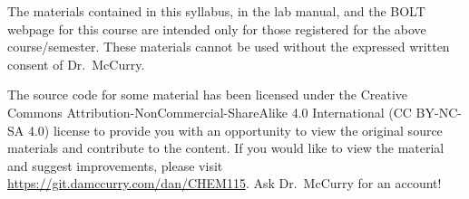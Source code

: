 \documentclass[11pt,letterpaper]{article}
\begin{document}
\vfill

\begin{mdframed}
	\noindent
	The materials contained in this syllabus, in the lab manual, and the
	BOLT webpage for this course are intended only for those registered for
	the above course/semester. These materials cannot be used without the
	expressed written consent of Dr.\ McCurry.

	\noindent
	The source code for some material has been licensed under the Creative
	Commons Attribution-NonCommercial-ShareAlike 4.0 International (CC
	BY-NC-SA 4.0) license to provide you with an opportunity to view the
	original source materials and contribute to the content. If you would
	like to view the material and suggest improvements, please visit
	\url{https://git.damccurry.com/dan/CHEM115}. Ask Dr.\ McCurry for an
	account!
\end{mdframed}
\end{document}
